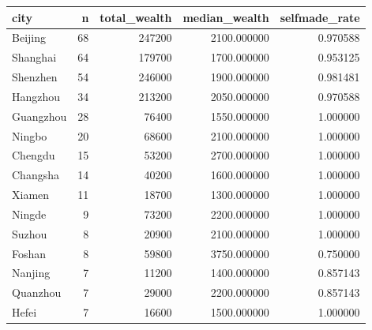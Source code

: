 \begin{tabular}{lrrrr}
\toprule
city & n & total\_wealth & median\_wealth & selfmade\_rate \\
\midrule
Beijing & 68 & 247200 & 2100.000000 & 0.970588 \\
Shanghai & 64 & 179700 & 1700.000000 & 0.953125 \\
Shenzhen & 54 & 246000 & 1900.000000 & 0.981481 \\
Hangzhou & 34 & 213200 & 2050.000000 & 0.970588 \\
Guangzhou & 28 & 76400 & 1550.000000 & 1.000000 \\
Ningbo & 20 & 68600 & 2100.000000 & 1.000000 \\
Chengdu & 15 & 53200 & 2700.000000 & 1.000000 \\
Changsha & 14 & 40200 & 1600.000000 & 1.000000 \\
Xiamen & 11 & 18700 & 1300.000000 & 1.000000 \\
Ningde & 9 & 73200 & 2200.000000 & 1.000000 \\
Suzhou & 8 & 20900 & 2100.000000 & 1.000000 \\
Foshan & 8 & 59800 & 3750.000000 & 0.750000 \\
Nanjing & 7 & 11200 & 1400.000000 & 0.857143 \\
Quanzhou & 7 & 29000 & 2200.000000 & 0.857143 \\
Hefei & 7 & 16600 & 1500.000000 & 1.000000 \\
\bottomrule
\end{tabular}
